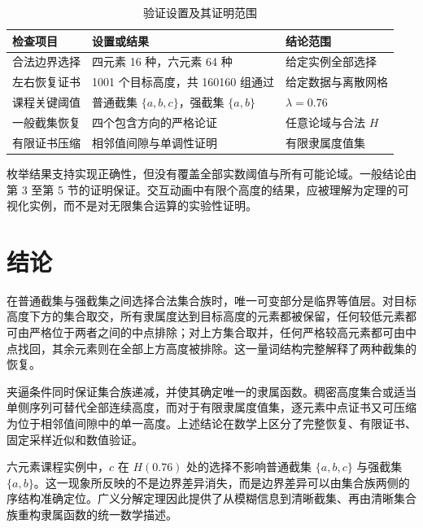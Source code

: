 \documentclass[UTF8,fontset=fandol,zihao=-4,a4paper]{ctexart}
\numberwithin{equation}{section}
\theoremstyle{reportplain}
\newcommand{\set}[1]{\{#1\}}
\begin{document}
\begin{table}[htbp]
\centering\small
\caption{验证设置及其证明范围}
\label{tab:validation}
\begin{tabular}{p{3.4cm}p{5.8cm}p{3.9cm}}
\toprule
检查项目 & 设置或结果 & 结论范围\\
\midrule
合法边界选择 & 四元素 16 种，六元素 64 种 & 给定实例全部选择\\
左右恢复证书 & 1001 个目标高度，共 160160 组通过 & 给定数据与离散网格\\
课程关键阈值 & 普通截集 $\set{a,b,c}$，强截集 $\set{a,b}$ & $\lambda=0.76$\\
一般截集恢复 & 四个包含方向的严格论证 & 任意论域与合法 $H$\\
有限证书压缩 & 相邻值间隙与单调性证明 & 有限隶属度值集\\
\bottomrule
\end{tabular}
\end{table}

枚举结果支持实现正确性，但没有覆盖全部实数阈值与所有可能论域。一般结论由第 3 至第 5 节的证明保证。交互动画中有限个高度的结果，应被理解为定理的可视化实例，而不是对无限集合运算的实验性证明。

\section{结论}
在普通截集与强截集之间选择合法集合族时，唯一可变部分是临界等值层。对目标高度下方的集合取交，所有隶属度达到目标高度的元素都被保留，任何较低元素都可由严格位于两者之间的中点排除；对上方集合取并，任何严格较高元素都可由中点找回，其余元素则在全部上方高度被排除。这一量词结构完整解释了两种截集的恢复。

夹逼条件同时保证集合族递减，并使其确定唯一的隶属函数。稠密高度集合或适当单侧序列可替代全部连续高度，而对于有限隶属度值集，逐元素中点证书又可压缩为位于相邻值间隙中的单一高度。上述结论在数学上区分了完整恢复、有限证书、固定采样近似和数值验证。

六元素课程实例中，$c$ 在 $H(0.76)$ 处的选择不影响普通截集 $\set{a,b,c}$ 与强截集 $\set{a,b}$。这一现象所反映的不是边界差异消失，而是边界差异可以由集合族两侧的序结构准确定位。广义分解定理因此提供了从模糊信息到清晰截集、再由清晰集合族重构隶属函数的统一数学描述。

\appendix
\end{document}
